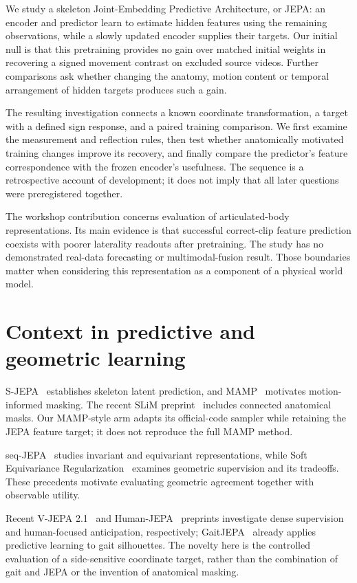 \documentclass{article}
\begin{document}
We study a skeleton Joint-Embedding Predictive Architecture, or JEPA: an encoder and predictor learn to estimate hidden features using the remaining observations, while a slowly updated encoder supplies their targets. Our initial null is that this pretraining provides no gain over matched initial weights in recovering a signed movement contrast on excluded source videos. Further comparisons ask whether changing the anatomy, motion content or temporal arrangement of hidden targets produces such a gain.

The resulting investigation connects a known coordinate transformation, a target with a defined sign response, and a paired training comparison. We first examine the measurement and reflection rules, then test whether anatomically motivated training changes improve its recovery, and finally compare the predictor's feature correspondence with the frozen encoder's usefulness. The sequence is a retrospective account of development; it does not imply that all later questions were preregistered together.

The workshop contribution concerns evaluation of articulated-body representations. Its main evidence is that successful correct-clip feature prediction coexists with poorer laterality readouts after pretraining. The study has no demonstrated real-data forecasting or multimodal-fusion result. Those boundaries matter when considering this representation as a component of a physical world model.

\section{Context in predictive and geometric learning}\label{context-in-predictive-and-geometric-learning}

S-JEPA~\citep{ref05} establishes skeleton latent prediction, and MAMP~\citep{ref06} motivates motion-informed masking. The recent SLiM preprint~\citep{ref07} includes connected anatomical masks. Our MAMP-style arm adapts its official-code sampler while retaining the JEPA feature target; it does not reproduce the full MAMP method.

seq-JEPA~\citep{ref08} studies invariant and equivariant representations, while Soft Equivariance Regularization~\citep{ref09} examines geometric supervision and its tradeoffs. These precedents motivate evaluating geometric agreement together with observable utility.

Recent V-JEPA 2.1~\citep{ref10} and Human-JEPA~\citep{ref11} preprints investigate dense supervision and human-focused anticipation, respectively; GaitJEPA~\citep{ref12} already applies predictive learning to gait silhouettes. The novelty here is the controlled evaluation of a side-sensitive coordinate target, rather than the combination of gait and JEPA or the invention of anatomical masking.
\end{document}
